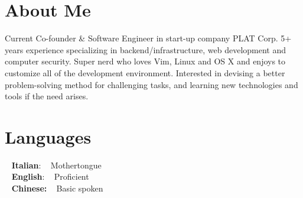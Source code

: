 \documentclass[letterpaper]{soragna-onepage-twocols} %
\begin{document}
\nocite{*}


\lastupdated %




\begin{minipage}[t]{0.3\textwidth} %


\section{About Me} 


Current Co-founder \& Software Engineer in start-up company PLAT Corp. 5+ years experience specializing in backend/infrastructure, web development and computer security. Super nerd who loves Vim, Linux and OS X and enjoys to customize all of the development environment. Interested in devising a better problem-solving method for challenging tasks, and learning new technologies and tools if the need arises.


\sectionspace %


\section{Languages} 


 ~ {\bf Italian}: ~ Mothertongue\\
 ~ {\bf English}: ~ Proficient\\
 ~ {\bf Chinese:} ~ Basic spoken



\end{minipage}
\end{document}
